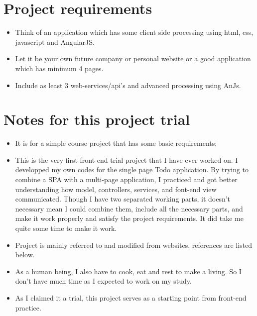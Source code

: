 \documentclass[9pt,b5paper]{article}
\begin{document}
\section{Project requirements}
\label{sec-9}
\begin{itemize}
\item Think of an application which has some client side processing using html, css, javascript and AngularJS.
\item Let it be your own future company or personal website or a good application which has minimum 4 pages.
\item Include as least 3 web-services/api's and advanced processing using AnJs.
\end{itemize}

\section{Notes for this project trial}
\label{sec-10}
\begin{itemize}
\item It is for a simple course project that has some basic requirements;
\item This is the very first front-end trial project that I have ever worked on. I developped my own codes for the single page Todo application. By trying to combine a SPA with a multi-page application, I practiced and got better understanding how model, controllers, services, and font-end view communicated. Though I have two separated working parts, it doesn't necessary mean I could combine them, include all the necessary parts, and make it work properly and satisfy the project requirements. It did take me quite some time to make it work.
\item Project is mainly referred to and modified from websites, references are listed below.
\item As a human being, I also have to cook, eat and rest to make a living. So I don't have much time as I expected to work on my study.
\item As I claimed it a trial, this project serves as a starting point from front-end practice.
\end{itemize}
\end{document}

